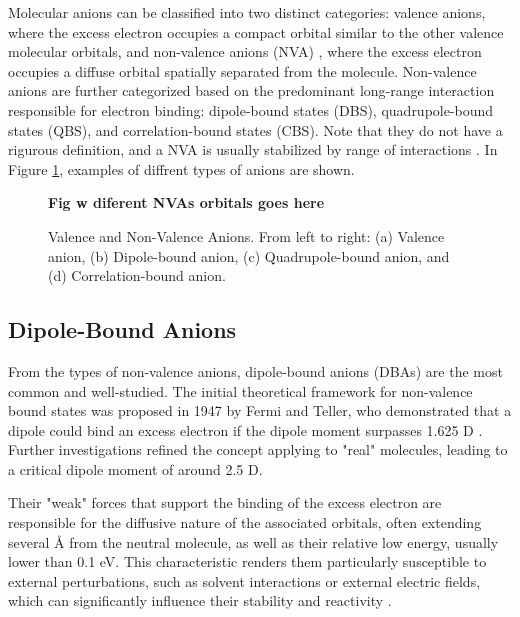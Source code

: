 Molecular anions can be classified into two distinct categories: valence anions, where the excess electron occupies a compact orbital similar to the other valence molecular orbitals, and non-valence anions (NVA) , where the excess electron occupies a diffuse orbital spatially separated from the molecule. Non-valence anions are further categorized based on the predominant long-range interaction responsible for electron binding: dipole-bound states (DBS), quadrupole-bound states (QBS), and correlation-bound states (CBS). Note that they do not have a rigurous definition, and a NVA is usually stabilized by range of interactions \cite{simons2008molecular,herbert2015quantum,abdoul1998electrons,simons2023molecular,jordan2003theory}. In Figure \ref{fig:AnionTypes}, examples of diffrent types of anions are shown.

\begin{figure}[h]
  \centering
  \textbf{Fig w diferent NVAs orbitals goes here}
  \caption[Valence and Non-Valence Anions]{Valence and Non-Valence Anions. From left to right: (a) Valence anion, (b) Dipole-bound anion, (c) Quadrupole-bound anion, and (d) Correlation-bound anion.}
  \label{fig:AnionTypes}
\end{figure}

\subsection{Dipole-Bound Anions}
From the types of non-valence anions, dipole-bound anions (DBAs) are the most common and well-studied. The initial theoretical framework for non-valence bound states was proposed in 1947 by Fermi and Teller, who demonstrated that a dipole could bind an excess electron if the dipole moment surpasses 1.625 D \cite{fermi1947capture}. Further investigations refined the concept applying to "real" molecules, leading to a critical dipole moment of around 2.5 D\cite{jordan2003theory}. 

Their "weak" forces that support the binding of the excess electron are responsible for the diffusive nature of the associated orbitals, often extending several \r{A} from the neutral molecule, as well as their relative low energy, usually lower than 0.1 eV. This characteristic renders them particularly susceptible to external perturbations, such as solvent interactions or external electric fields, which can significantly influence their stability and reactivity \cite{simons2008molecular,herbert2015quantum,jordan2003theory}.

